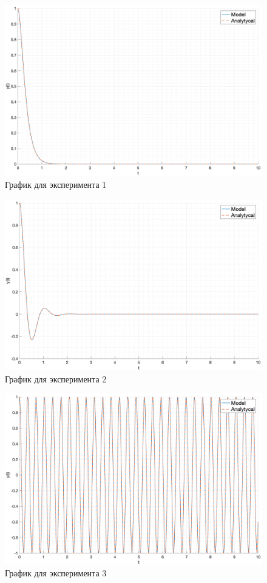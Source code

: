 \begin{figure}[hb!]
    \centering
    \includegraphics[width=\textwidth]{media/case1.png}
    \caption{График для эксперимента 1}
    \label{fig:case1}
\end{figure}

\begin{figure}[ht!]
    \centering
    \includegraphics[width=\textwidth]{media/case2.png}
    \caption{График для эксперимента 2}
    \label{fig:case2}
\end{figure}

\begin{figure}[ht!]
    \centering
    \includegraphics[width=\textwidth]{media/case3.png}
    \caption{График для эксперимента 3}
    \label{fig:case3}
\end{figure}


